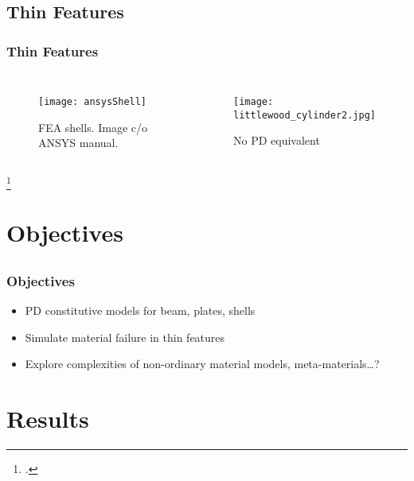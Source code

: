 \subsection{Thin Features}
%
\begin{frame}
  \frametitle{Thin Features}
  
     \vfill
     \begin{columns}[b] %
       

       \begin{figure}
           \centering
           \texttt{[image: ansysShell]}
           \caption{FEA shells. Image c/o ANSYS manual.}
       \end{figure}
       

       \vspace{-0.8cm}
       \begin{figure}
           \centering
           \texttt{[image: littlewood\_cylinder2.jpg]}
           \caption{No PD equivalent}
       \end{figure}
     
     \end{columns}
     
     \footcite{littlewood2010}

\end{frame}
%
%
\section{Objectives}
\subsection{}
%
\begin{frame}
\frametitle{Objectives}

   \begin{itemize}
        \item PD constitutive models for beam, plates, shells
        \item Simulate material failure in thin features
        \item Explore complexities of non-ordinary material models, meta-materials\ldots?
  \end{itemize}

\end{frame}
%
%
\section{Results}
%
